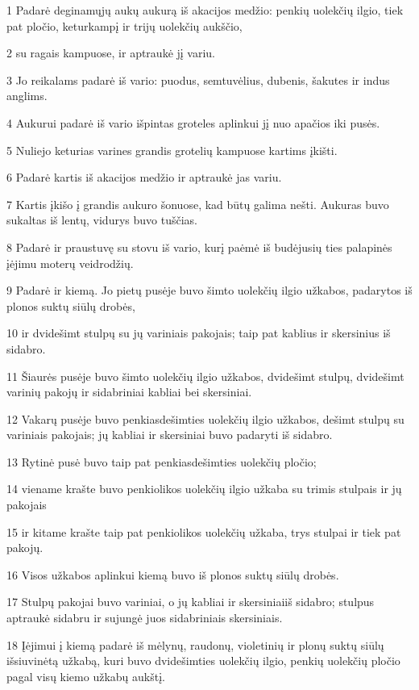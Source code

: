 \par 1 Padarė deginamųjų aukų aukurą iš akacijos medžio: penkių uolekčių ilgio, tiek pat pločio, keturkampį ir trijų uolekčių aukščio, 
\par 2 su ragais kampuose, ir aptraukė jį variu. 
\par 3 Jo reikalams padarė iš vario: puodus, semtuvėlius, dubenis, šakutes ir indus anglims. 
\par 4 Aukurui padarė iš vario išpintas groteles aplinkui jį nuo apačios iki pusės. 
\par 5 Nuliejo keturias varines grandis grotelių kampuose kartims įkišti. 
\par 6 Padarė kartis iš akacijos medžio ir aptraukė jas variu. 
\par 7 Kartis įkišo į grandis aukuro šonuose, kad būtų galima nešti. Aukuras buvo sukaltas iš lentų, vidurys buvo tuščias. 
\par 8 Padarė ir praustuvę su stovu iš vario, kurį paėmė iš budėjusių ties palapinės įėjimu moterų veidrodžių. 
\par 9 Padarė ir kiemą. Jo pietų pusėje buvo šimto uolekčių ilgio užkabos, padarytos iš plonos suktų siūlų drobės, 
\par 10 ir dvidešimt stulpų su jų variniais pakojais; taip pat kablius ir skersinius iš sidabro. 
\par 11 Šiaurės pusėje buvo šimto uolekčių ilgio užkabos, dvidešimt stulpų, dvidešimt varinių pakojų ir sidabriniai kabliai bei skersiniai. 
\par 12 Vakarų pusėje buvo penkiasdešimties uolekčių ilgio užkabos, dešimt stulpų su variniais pakojais; jų kabliai ir skersiniai buvo padaryti iš sidabro. 
\par 13 Rytinė pusė buvo taip pat penkiasdešimties uolekčių pločio; 
\par 14 viename krašte buvo penkiolikos uolekčių ilgio užkaba su trimis stulpais ir jų pakojais 
\par 15 ir kitame krašte taip pat penkiolikos uolekčių užkaba, trys stulpai ir tiek pat pakojų. 
\par 16 Visos užkabos aplinkui kiemą buvo iš plonos suktų siūlų drobės. 
\par 17 Stulpų pakojai buvo variniai, o jų kabliai ir skersiniai­iš sidabro; stulpus aptraukė sidabru ir sujungė juos sidabriniais skersiniais. 
\par 18 Įėjimui į kiemą padarė iš mėlynų, raudonų, violetinių ir plonų suktų siūlų išsiuvinėtą užkabą, kuri buvo dvidešimties uolekčių ilgio, penkių uolekčių pločio pagal visų kiemo užkabų aukštį. 
